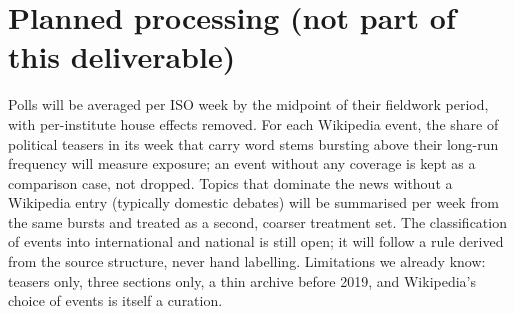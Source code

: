 \documentclass[10pt,a4paper]{article}
\begin{document}
\section*{Planned processing (not part of this deliverable)}
Polls will be averaged per ISO week by the midpoint of their fieldwork period, with per-institute house effects removed.
For each Wikipedia event, the share of political teasers in its week that carry word stems bursting above their long-run
frequency will measure exposure; an event without any coverage is kept as a comparison case, not dropped. Topics that
dominate the news without a Wikipedia entry (typically domestic debates) will be summarised per week from the same bursts
and treated as a second, coarser treatment set. The classification of events into international and national is still
open; it will follow a rule derived from the source structure, never hand labelling. Limitations we already know: teasers
only, three sections only, a thin archive before 2019, and Wikipedia's choice of events is itself a curation.
\end{document}
